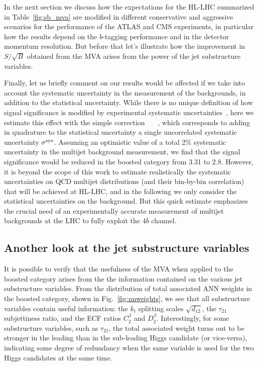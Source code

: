 In the next section we discuss how the expectations for the HL-LHC
summarized in  Table~\ref{fig:sb_mva} are modified in different
conservative and aggressive scenarios for the performance of the
ATLAS and CMS experiments, in particular how the results depend
on the $b$-tagging performance and in the detector momentum
resolution.
%
But before that let's illustrate how the improvement in $S/\sqrt{B}$
obtained from the MVA arises from the power of the jet
substructure variables.

Finally, let us briefly comment on our results would be affected
if we take into account the systematic uncertainty in the measurement
of the backgrounds, in addition to the statistical uncertainty.
%
While there is no unique definition of how signal significance is modified
by experimental systematic uncertainties~\cite{Bityukov:2002eq}, here we estimate
this effect with the simple correction
\be
{} \, \to \,   \, ,
\ee
which corresponds to adding in quadrature to the statistical uncertainty  a single
uncorrelated systematic uncertainty $\sigma^{\rm sys}$.
%
Assuming an optimistic value of a total 2\% systematic uncertainty in the
multijet background measurement, we find that the signal significance would be
reduced in the boosted category from 3.31 to 2.8.
%
However, it is beyond the scope of this work to estimate realistically
the systematic uncertainties on QCD multijet distributions (and their bin-by-bin correlation)
that will be achieved at HL-LHC, and in the following we only consider the statistical
uncertainties on the background.
%
But this quick estimate emphasizes the crucial need of an experimentally accurate
measurement of multijet backgrounds at the LHC to fully exploit the $4b$ channel.


\subsection{Another look at the jet substructure variables}

It is possible to verify that the usefulness of the MVA when
applied to the boosted category arises from the 
the information contained on the various jet substructure variables.
%
From the distribution of total associated ANN weights in the
boosted category, shown in Fig.~\ref{fig:nnweights}, we see that
all substructure variables contain useful information:
the $k_t$ splitting scales $\sqrt{d_{12}}$,
the $\tau_{21}$ subjettiness ratio, and the ECF ratios
$C_2^{{\beta}}$ and $D_2^{{\beta}}$.
%
Interestingly, for some substructure variables, such as $\tau_{21}$,
the total associated weight turns out to be stronger in the leading
than in the sub-leading Higgs candidate (or vice-versa), indicating some
degree of redundancy when the same variable is used for the two Higgs candidates
at the same time.


